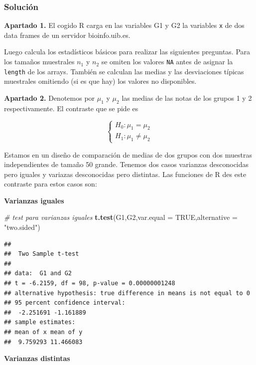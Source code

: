 \documentclass[
]{article}
\newenvironment{Shaded}{\begin{snugshade}}{\end{snugshade}}
\newcommand{\CommentTok}[1]{\textcolor[rgb]{0.56,0.35,0.01}{\textit{#1}}}
\newcommand{\DataTypeTok}[1]{\textcolor[rgb]{0.13,0.29,0.53}{#1}}
\newcommand{\KeywordTok}[1]{\textcolor[rgb]{0.13,0.29,0.53}{\textbf{#1}}}
\newcommand{\NormalTok}[1]{#1}
\newcommand{\OtherTok}[1]{\textcolor[rgb]{0.56,0.35,0.01}{#1}}
\newcommand{\StringTok}[1]{\textcolor[rgb]{0.31,0.60,0.02}{#1}}
\begin{document}
\hypertarget{soluciuxf3n}{%
\subsubsection{Solución}\label{soluciuxf3n}}

\textbf{Apartado 1.} El cogido R carga en las variables G1 y G2 la
variables \texttt{x} de dos data frames de un servidor bioinfo.uib.es.

Luego calcula los estadísticos básicos para realizar las siguientes
preguntas. Para los tamaños muestrales \(n_1\) y \(n_2\) se omiten los
valores \texttt{NA} antes de asignar la \texttt{length} de los arrays.
También se calculan las medias y las desviaciones típicas muestrales
omitiendo (si es que hay) los valores no disponibles.

\textbf{Apartado 2.} Denotemos por \(\mu_1\) y \(\mu_2\) las medias de
las notas de los grupos 1 y 2 respectivamente. El contraste que se pide
es

\[
\left\{\begin{array}{ll}
H_0:\mu_{1} = \mu_{2}\\
H_1: \mu_{1} \not= \mu_{2}
\end{array}\right.
\]

Estamos en un diseño de comparación de medias de dos grupos con dos
muestras independientes de tamaño 50 grande. Tenemos dos casos varianzas
desconocidas pero iguales y variazas desconocidas pero distintas. Las
funciones de R des este contraste para estos casos son:

\textbf{Varianzas iguales}

\begin{Shaded}
\begin{Highlighting}[]
\CommentTok{\# test para varianzas iguales}
\KeywordTok{t.test}\NormalTok{(G1,G2,}\DataTypeTok{var.equal =} \OtherTok{TRUE}\NormalTok{,}\DataTypeTok{alternative =} \StringTok{"two.sided"}\NormalTok{)}
\end{Highlighting}
\end{Shaded}

\begin{verbatim}
## 
##  Two Sample t-test
## 
## data:  G1 and G2
## t = -6.2159, df = 98, p-value = 0.00000001248
## alternative hypothesis: true difference in means is not equal to 0
## 95 percent confidence interval:
##  -2.251691 -1.161889
## sample estimates:
## mean of x mean of y 
##  9.759293 11.466083
\end{verbatim}

\textbf{Varianzas distintas}
\end{document}
